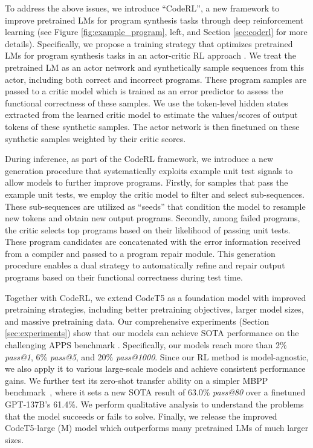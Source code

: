 \documentclass{article}
\begin{document}
To address the above issues, we introduce ``CodeRL'', a new framework to improve pretrained LMs for program synthesis tasks through deep reinforcement learning (see Figure \ref{fig:example_program}, left, and Section \ref{sec:coderl} for more details). 
Specifically, we propose a training strategy that optimizes pretrained LMs for program synthesis tasks in an actor-critic RL approach \citep{konda1999actor, sutton1999policy}.
We treat the pretrained LM as an actor network and synthetically sample sequences from this actor, including both correct and incorrect programs.
These program samples are passed to a critic model which is trained as an error predictor to assess the functional correctness of these samples.
We use the token-level hidden states extracted from the learned critic model to estimate the values/scores of output tokens of these synthetic samples. 
The actor network is then finetuned on these synthetic samples weighted by their critic scores. 

During inference, as part of the CodeRL framework, we introduce a new generation procedure that systematically exploits example unit test signals to allow models to further improve programs. 
Firstly, for samples that pass the example unit tests, we employ the critic model to filter and select sub-sequences.
These sub-sequences are utilized as ``seeds'' that condition the model to resample new tokens and obtain new output programs. 
Secondly, among failed programs, the critic selects top programs based on their likelihood of passing unit tests. 
These program candidates are concatenated with the error information received from a compiler and passed to a program repair module.
This generation procedure enables a dual strategy to automatically refine and repair output programs based on their functional correctness during test time. 



Together with CodeRL, we extend CodeT5 as a foundation model with improved pretraining strategies, including better pretraining objectives, larger model sizes, and massive pretraining data. 
Our comprehensive experiments (Section \ref{sec:experiments}) show that our models can achieve SOTA performance on the challenging APPS benchmark \citep{hendrycksapps2021}.
Specifically, our models reach more than 2\% \emph{pass@1}, 6\% \emph{pass@5}, and 20\% \emph{pass@1000}. 
Since our RL method is model-agnostic, we also apply it to various large-scale models and achieve consistent performance gains. 
We further test its zero-shot transfer ability on a simpler MBPP benchmark~\citep{austin2021program}, where it sets a new SOTA result of 63.0\% \emph{pass@80} over a finetuned GPT-137B's 61.4\%.
We perform qualitative analysis to understand the problems that the model succeeds or fails to solve. 
Finally, we release the improved CodeT5-large (M) model which outperforms many pretrained LMs of much larger sizes.
\end{document}
